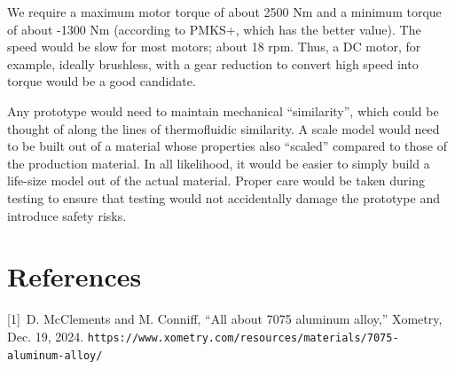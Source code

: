 \documentclass[12pt]{article}
\begin{document}
We require a maximum motor torque of about 2500 Nm and a minimum torque of about -1300 Nm (according to PMKS+, which has the better value). The speed would be slow for most motors; about 18 rpm. Thus, a DC motor, for example, ideally brushless, with a gear reduction to convert high speed into torque would be a good candidate.

Any prototype would need to maintain mechanical ``similarity'', which could be thought of along the lines of thermofluidic similarity. A scale model would need to be built out of a material whose properties also ``scaled'' compared to those of the production material. In all likelihood, it would be easier to simply build a life-size model out of the actual material. Proper care would be taken during testing to ensure that testing would not accidentally damage the prototype and introduce safety risks.

\section{References}%
\label{ref}

[1]\ D. McClements and M. Conniff, ``All about 7075 aluminum alloy,'' Xometry, Dec. 19, 2024. \texttt{https://www.xometry.com/resources/materials/7075-aluminum-alloy/}
\end{document}
